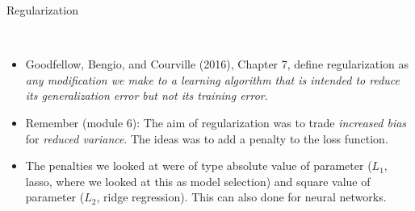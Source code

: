 \documentclass[10pt,ignorenonframetext,]{beamer}
\providecommand{\tightlist}{%
  \setlength{\itemsep}{0pt}\setlength{\parskip}{0pt}}
\begin{document}
\begin{frame}

\begin{block}{Regularization}

\(~\)

\begin{itemize}
\tightlist
\item
  Goodfellow, Bengio, and Courville (2016), Chapter 7, define
  regularization as \emph{any modification we make to a learning
  algorithm that is intended to reduce its generalization error but not
  its training error}.
\end{itemize}

\vspace{2mm}

\begin{itemize}
\tightlist
\item
  Remember (module 6): The aim of regularization was to trade
  \emph{increased bias} for \emph{reduced variance}. The ideas was to
  add a penalty to the loss function.
\end{itemize}

\vspace{2mm}

\begin{itemize}
\tightlist
\item
  The penalties we looked at were of type absolute value of parameter
  (\(L_1\), lasso, where we looked at this as model selection) and
  square value of parameter (\(L_2\), ridge regression). This can also
  done for neural networks.
\end{itemize}

\vspace{2mm}

\end{block}

\end{frame}
\end{document}
